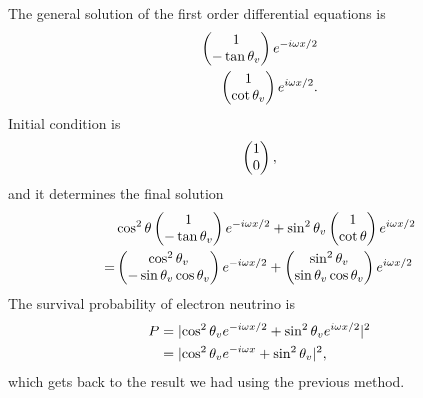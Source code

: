 \documentclass[letterpaper,12pt,english]{sphinxmanual}
\begin{document}
The general solution of the first order differential equations is
\begin{gather}
\begin{split}\begin{pmatrix}
1 \\ -\tan\theta_v
\end{pmatrix} e^{-i \omega x/ 2 } \\
\begin{pmatrix}
1 \\ \cot \theta_v
\end{pmatrix} e^{i  \omega x/ 2 }.\end{split}\notag
\end{gather}
Initial condition is
\begin{gather}
\begin{split}\begin{pmatrix}
1 \\ 0
\end{pmatrix},\end{split}\notag
\end{gather}
and it determines the final solution
\begin{gather}
\begin{split}& \cos^2\theta \begin{pmatrix}
1 \\ -\tan\theta_v
\end{pmatrix} e^{-i \omega x/ 2 } + \sin^2\theta_v
\begin{pmatrix}
1 \\ \cot \theta
\end{pmatrix} e^{i  \omega x/ 2 } \\
= & \begin{pmatrix}
\cos^2\theta_v \\ -\sin\theta_v \cos\theta_v
\end{pmatrix} e^{-i \omega x/ 2 } +
\begin{pmatrix}
\sin^2\theta_v \\ \sin\theta_v \cos \theta_v
\end{pmatrix} e^{i  \omega x/ 2 }\end{split}\notag
\end{gather}
The survival probability of electron neutrino is
\begin{gather}
\begin{split}P &= \lvert \cos^2\theta_v e^{-i \omega x/2} + \sin^2\theta_v e^{i\omega x/2} \rvert^2 \\
& = \lvert \cos^2 \theta_v e^{-i \omega x} + \sin^2 \theta_v \rvert ^2 ,\end{split}\notag
\end{gather}
which gets back to the result we had using the previous method.
\end{document}

